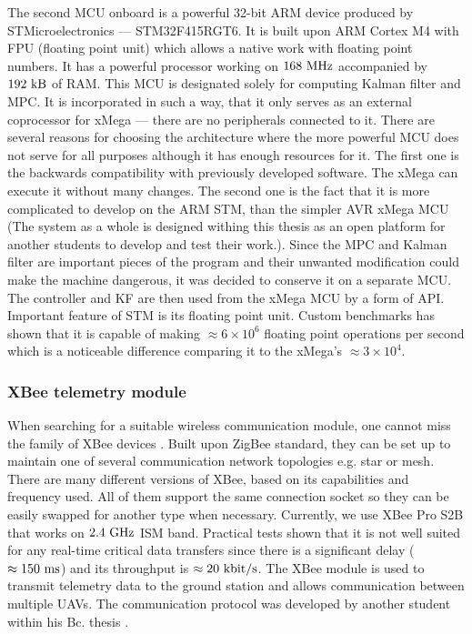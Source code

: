 The second MCU onboard is a powerful 32-bit ARM device produced by STMicroelectronics --- STM32F415RGT6. It is built upon ARM Cortex M4 with FPU (floating point unit) which allows a native work with floating point numbers. It has a powerful processor working on $168 ~\mathrm{MHz}$ accompanied by $192 ~\mathrm{kB}$ of RAM. This MCU is designated solely for computing Kalman filter and MPC. It is incorporated in such a way, that it only serves as an external coprocessor for xMega --- there are no peripherals connected to it. There are several reasons for choosing the architecture where the more powerful MCU does not serve for all purposes although it has enough resources for it. The first one is the backwards compatibility with previously developed software. The xMega can execute it without many changes. The second one is the fact that it is more complicated to develop on the ARM STM, than the simpler AVR xMega MCU (The system as a whole is designed withing this thesis as an open platform for another students to develop and test their work.). Since the MPC and Kalman filter are important pieces of the program and their unwanted modification could make the machine dangerous, it was decided to conserve it on a separate MCU. The controller and KF are then used from the xMega MCU by a form of API. Important feature of STM is its floating point unit. Custom benchmarks has shown that it is capable of making $\approx 6 \times 10^6$ floating point operations per second which is a noticeable  difference comparing it to the xMega's $\approx 3\times 10^4$.
\subsubsection{XBee telemetry module}

When searching for a suitable wireless communication module, one cannot miss the family of XBee devices \citep{xbee}. Built upon ZigBee standard, they can be set up to maintain one of several communication network topologies e.g. star or mesh. There are many different versions of XBee, based on its capabilities and frequency used. All of them support the same connection socket so they can be easily swapped for another type when necessary. Currently, we use XBee Pro S2B that works on $2.4~\mathrm{GHz}$ ISM band. Practical tests shown that it is not well suited for any real-time critical data transfers since there is a significant delay ($\approx 150~\mathrm{ms}$)  and its throughput is $\approx 20~\mathrm{kbit/s}$. The XBee module is used to transmit telemetry data to the ground station and allows communication between multiple UAVs. The communication protocol was developed by another student within his Bc. thesis \citep{fiedler2015}.

